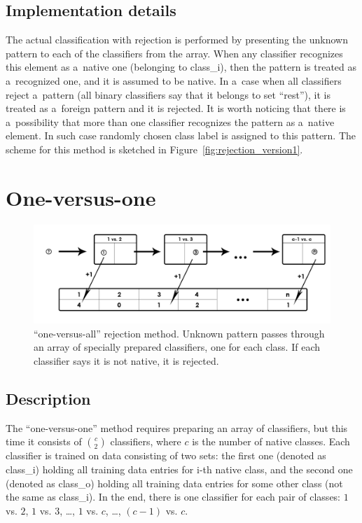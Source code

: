 \subsection{Implementation details}

The actual classification with rejection is performed by presenting the unknown pattern to each of the classifiers from the array. When any classifier recognizes this element as a~native one (belonging to class\_i), then the pattern is treated as a~recognized one, and it is assumed to be native. In a~case when all classifiers reject a~pattern (all binary classifiers say that it belongs to set ``rest''), it is treated as a~foreign pattern and it is rejected. It is worth noticing that there is a~possibility that more than one classifier recognizes the pattern as a~native element. In such case randomly chosen class label is assigned to this pattern. The scheme for this method is sketched in Figure~\ref{fig:rejection_version1}. 

\section{One-versus-one}
\label{one-versus-all}

\begin{figure}[htp]
	\centering
	\includegraphics[width=1\textwidth]{Figures/classification_with_rejection2.jpg}
	\caption{``one-versus-all'' rejection method. Unknown pattern passes through an array of specially prepared classifiers, one for each class. If each classifier says it is not native, it is rejected. }
	\label{fig:rejection_version2}\vspace{-3pt}
\end{figure}

\subsection{Description}

The ``one-versus-one'' method requires preparing an array of classifiers, but this time it consists of ${c}\choose{2}$ classifiers, where $c$ is the number of native classes. Each classifier is trained on data consisting of two sets: the first one (denoted as class\_i) holding all training data entries for i-th native class, and the second one (denoted as class\_o) holding all training data entries for some other class (not the same as class\_i). In the end, there is one classifier for each pair of classes: $1$ vs. $2$, $1$ vs. $3$, \dots, $1$ vs. $c$, \dots, $(c-1)$ vs. $c$. 

